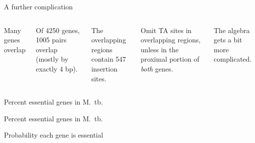 \documentclass[aspectratio=169,12pt,t]{beamer}
\begin{document}
\begin{frame}{A further complication}

\begin{columns}


{\color{title} Many genes overlap}

\bi

\item Of 4250 genes, 1005 pairs overlap (mostly by exactly 4 bp).
\item The overlapping regions contain 547 insertion sites.
\item {\vhilit Omit TA sites in overlapping regions, unless in the
proximal portion of \emph{both\/} genes}.
\item The algebra gets a bit more complicated.
\ei



\end{columns}

\note{
}
\end{frame}




\begin{frame}[c]{Percent essential genes in M.\ tb.}


\note{
}
\end{frame}


\begin{frame}[c]{Percent essential genes in M.\ tb.}


\note{
}
\end{frame}



\begin{frame}[c]{Probability each gene is essential}


\note{
}
\end{frame}
\end{document}

